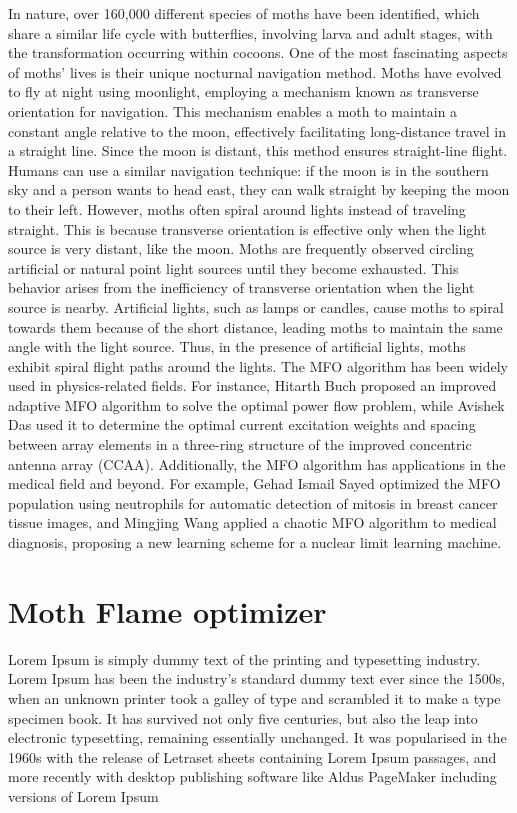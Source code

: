 \documentclass[conference]{IEEEtran}
\begin{document}
In nature, over 160,000 different species of moths have been identified, which share a similar life cycle with butterflies, involving larva and adult stages, with the transformation occurring within cocoons. One of the most fascinating aspects of moths’ lives is their unique nocturnal navigation method. Moths have evolved to fly at night using moonlight, employing a mechanism known as transverse orientation for navigation. This mechanism enables a moth to maintain a constant angle relative to the moon, effectively facilitating long-distance travel in a straight line. Since the moon is distant, this method ensures straight-line flight. Humans can use a similar navigation technique: if the moon is in the southern sky and a person wants to head east, they can walk straight by keeping the moon to their left. However, moths often spiral around lights instead of traveling straight. This is because transverse orientation is effective only when the light source is very distant, like the moon. Moths are frequently observed circling artificial or natural point light sources until they become exhausted. This behavior arises from the inefficiency of transverse orientation when the light source is nearby. Artificial lights, such as lamps or candles, cause moths to spiral towards them because of the short distance, leading moths to maintain the same angle with the light source. Thus, in the presence of artificial lights, moths exhibit spiral flight paths around the lights.
The MFO algorithm has been widely used in physics-related fields. For instance, Hitarth Buch proposed an improved adaptive MFO algorithm to solve the optimal power flow problem, while Avishek Das used it to determine the optimal current excitation weights and spacing between array elements in a three-ring structure of the improved concentric antenna array (CCAA). Additionally, the MFO algorithm has applications in the medical field and beyond. For example, Gehad Ismail Sayed optimized the MFO population using neutrophils for automatic detection of mitosis in breast cancer tissue images, and Mingjing Wang applied a chaotic MFO algorithm to medical diagnosis, proposing a new learning scheme for a nuclear limit learning machine.

\section{Moth Flame optimizer}
Lorem Ipsum is simply dummy text of the printing and typesetting industry. Lorem Ipsum has been the industry's standard dummy text ever since the 1500s, when an unknown printer took a galley of type and scrambled it to make a type specimen book. It has survived not only five centuries, but also the leap into electronic typesetting, remaining essentially unchanged. It was popularised in the 1960s with the release of Letraset sheets containing Lorem Ipsum passages, and more recently with desktop publishing software like Aldus PageMaker including versions of Lorem Ipsum	
\end{document}
